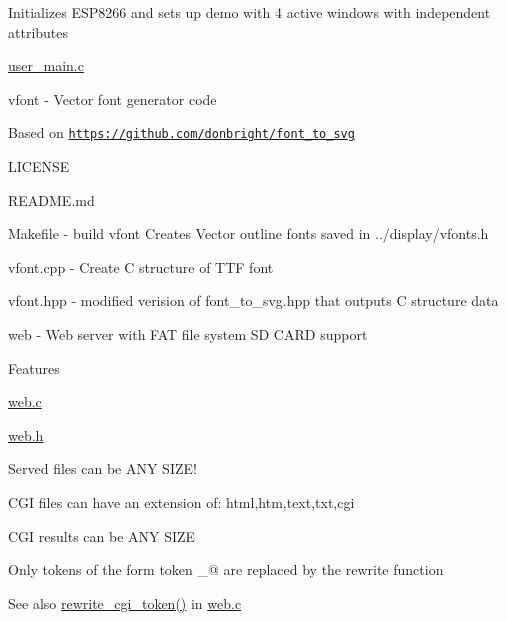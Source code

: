\begin{DoxyItemize}
\begin{DoxyItemize}
\item Initializes E\+S\+P8266 and sets up demo with 4 active windows with independent attributes
\begin{DoxyItemize}
\item \hyperlink{user__main_8c}{user\+\_\+main.\+c}
\end{DoxyItemize}
\end{DoxyItemize}
\item vfont -\/ Vector font generator code
\begin{DoxyItemize}
\item Based on \href{https://github.com/donbright/font_to_svg}{\tt https\+://github.\+com/donbright/font\+\_\+to\+\_\+svg}
\begin{DoxyItemize}
\item L\+I\+C\+E\+N\+SE
\item R\+E\+A\+D\+M\+E.\+md
\item Makefile -\/ build vfont Creates Vector outline fonts saved in ../display/vfonts.h
\item vfont.\+cpp -\/ Create C structure of T\+TF font
\item vfont.\+hpp -\/ modified verision of font\+\_\+to\+\_\+svg.\+hpp that outputs C structure data
\end{DoxyItemize}
\end{DoxyItemize}
\item web -\/ Web server with F\+AT file system SD C\+A\+RD support
\begin{DoxyItemize}
\item Features
\begin{DoxyItemize}
\item \hyperlink{web_8c}{web.\+c}
\item \hyperlink{web_8h}{web.\+h}
\end{DoxyItemize}
\item Served files can be A\+NY S\+I\+Z\+E!
\begin{DoxyItemize}
\item C\+GI files can have an extension of\+: html,htm,text,txt,cgi
\item C\+GI results can be A\+NY S\+I\+ZE
\end{DoxyItemize}
\item Only tokens of the form  token \+\_\+@ are replaced by the rewrite function
\begin{DoxyItemize}
\item \begin{DoxySeeAlso}{See also}
\hyperlink{web_8c_abfb5be0ab21dfe56bc934a8965154384}{rewrite\+\_\+cgi\+\_\+token()} in \hyperlink{web_8c}{web.\+c}
\end{DoxySeeAlso}


\end{DoxyItemize}
\end{DoxyItemize}
\end{DoxyItemize}
